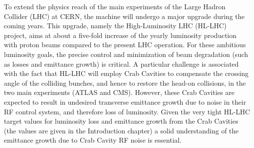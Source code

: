 To extend the physics reach of the main experiments of the Large Hadron Collider (LHC) at CERN, the machine will undergo a major upgrade during the coming years. This upgrade, namely the High-Luminosity LHC (HL-LHC) project, aims at about a five-fold increase of the yearly luminosity production with proton beams compared to the present LHC operation. For these ambitious luminosity goals, the precise control and minimization of beam degradation (such as losses and emittance growth) is critical. A particular challenge is associated with the fact that HL-LHC will employ Crab Cavities to compensate the crossing angle of the colliding bunches, and hence to restore the head-on collisions, in the two main experiments (ATLAS and CMS). However, these Crab Cavities are expected to result in undesired transverse emittance growth due to noise in their RF control system, and therefore loss of luminosity. %
Given the very tight HL-LHC target values for luminosity loss and emittance growth from the Crab Cavities (the values are given in the Introduction chapter)
a solid understanding of the emittance growth due to Crab Cavity RF noise is essential. 


